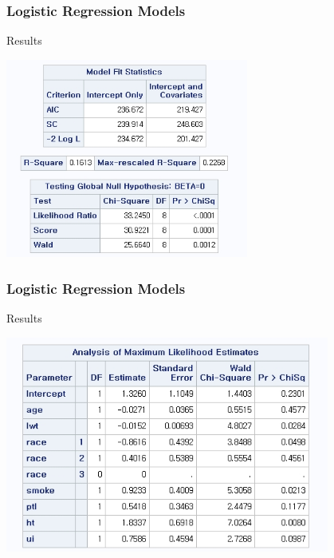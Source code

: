 \documentclass[10pt,xcolor={svgnames},t]{beamer}
\begin{document}
%
\begin{frame}
	\frametitle{Logistic Regression Models}
	
	\begin{block}{Results}
		\begin{center}
			\includegraphics[width=0.6\textwidth]{ex3.jpg}
		\end{center} 
	\end{block}
	
\end{frame}
%
%
\begin{frame}
	\frametitle{Logistic Regression Models}
	
	\begin{block}{Results}
		\begin{center}
			\includegraphics[width=0.8\textwidth]{ex4.jpg}
		\end{center} 
	\end{block}
	
\end{frame}
\end{document}
